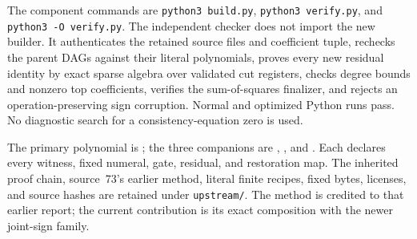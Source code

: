 The component commands are \texttt{python3 build.py},
\texttt{python3 verify.py}, and \texttt{python3 -O verify.py}.
The independent checker does not import the new builder.  It authenticates
the retained source files and coefficient tuple, rechecks the parent DAGs
against their literal polynomials, proves every new residual identity by
exact sparse algebra over validated cut registers, checks degree bounds
and nonzero top coefficients, verifies the sum-of-squares finalizer,
and rejects an operation-preserving sign corruption.  Normal and optimized
Python runs pass.  No diagnostic search for a consistency-equation zero
is used.

The primary polynomial is ; the three
companions are ,
, and
.  Each declares every witness, fixed
numeral, gate, residual, and restoration map.  The inherited proof chain,
source~73's earlier method, literal finite recipes, fixed bytes, licenses,
and source hashes are retained under \texttt{upstream/}.  The method is
credited to that earlier report; the current contribution is its exact
composition with the newer joint-sign family.
